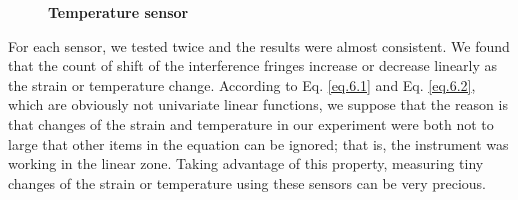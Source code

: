 \documentclass[10pt,a4paper,twocolumn,twoside,UTF8]{article}
\begin{document}
	\begin{figure}[htbp]
		\centering

		\caption{\textbf{Temperature sensor}}
		\label{fig.2.2}
	\end{figure}
	
	
	For each sensor, we tested twice and the results were almost consistent. We found that the count of shift of the interference fringes increase or decrease linearly as the strain or temperature change.
	According to Eq. \ref{eq.6.1} and Eq. \ref{eq.6.2}, which are obviously not univariate linear functions, 
	we suppose that the reason is that changes of the strain and temperature in our experiment were both not to large that other items in the equation can be ignored; that is, the instrument was working in the linear zone.
	Taking advantage of this property, measuring tiny changes of the strain or temperature using these sensors can be very precious.
	
\end{document}
